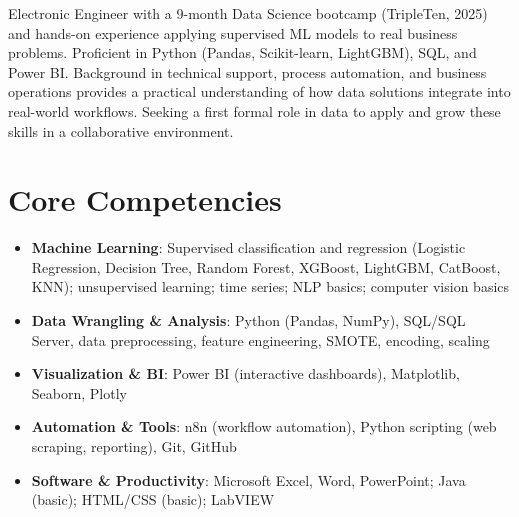 \documentclass[11pt,a4paper,sans]{moderncv}
\begin{document}
\makecvtitle


\vspace{6pt}
\small{Electronic Engineer with a 9-month Data Science bootcamp (TripleTen, 2025) and hands-on experience applying supervised ML models to real business problems. Proficient in Python (Pandas, Scikit-learn, LightGBM), SQL, and Power BI. Background in technical support, process automation, and business operations provides a practical understanding of how data solutions integrate into real-world workflows. Seeking a first formal role in data to apply and grow these skills in a collaborative environment.}


\section{Core Competencies}
\vspace{1pt}
\begin{itemize}

\item \textbf{Machine Learning}: Supervised classification and regression (Logistic Regression, Decision Tree, Random Forest, XGBoost, LightGBM, CatBoost, KNN); unsupervised learning; time series; NLP basics; computer vision basics

\item \textbf{Data Wrangling \& Analysis}: Python (Pandas, NumPy), SQL/SQL Server, data preprocessing, feature engineering, SMOTE, encoding, scaling

\item \textbf{Visualization \& BI}: Power BI (interactive dashboards), Matplotlib, Seaborn, Plotly

\item \textbf{Automation \& Tools}: n8n (workflow automation), Python scripting (web scraping, reporting), Git, GitHub

\item \textbf{Software \& Productivity}: Microsoft Excel, Word, PowerPoint; Java (basic); HTML/CSS (basic); LabVIEW

\end{itemize}

\end{document}
